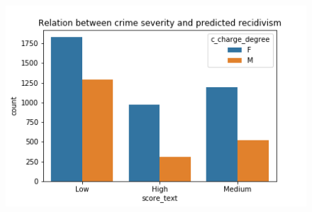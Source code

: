 \documentclass[11pt, fleqn, titlepage]{article}
\begin{document}
	\begin{figure}[H]
		\centering
		\includegraphics[width=0.5\linewidth]{imgs/charge_degree_score}
		\caption{}
		\label{fig:chargedegreescore}
	\end{figure}
	
	\newpage
	
	
\end{document}
